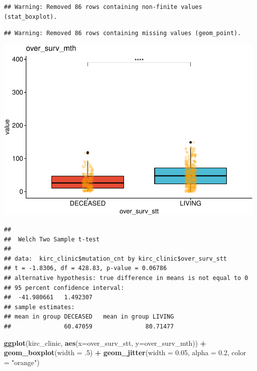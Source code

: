 \documentclass[]{article}
\newenvironment{Shaded}{\begin{snugshade}}{\end{snugshade}}
\newcommand{\KeywordTok}[1]{\textcolor[rgb]{0.13,0.29,0.53}{\textbf{#1}}}
\newcommand{\DataTypeTok}[1]{\textcolor[rgb]{0.13,0.29,0.53}{#1}}
\newcommand{\DecValTok}[1]{\textcolor[rgb]{0.00,0.00,0.81}{#1}}
\newcommand{\FloatTok}[1]{\textcolor[rgb]{0.00,0.00,0.81}{#1}}
\newcommand{\StringTok}[1]{\textcolor[rgb]{0.31,0.60,0.02}{#1}}
\newcommand{\OperatorTok}[1]{\textcolor[rgb]{0.81,0.36,0.00}{\textbf{#1}}}
\newcommand{\NormalTok}[1]{#1}
\begin{document}
\begin{verbatim}
## Warning: Removed 86 rows containing non-finite values (stat_boxplot).
\end{verbatim}

\begin{verbatim}
## Warning: Removed 86 rows containing missing values (geom_point).
\end{verbatim}

\includegraphics{figs/render-unnamed-chunk-12-6.pdf}

\begin{Shaded}
\end{Shaded}

\begin{verbatim}
## 
##  Welch Two Sample t-test
## 
## data:  kirc_clinic$mutation_cnt by kirc_clinic$over_surv_stt
## t = -1.8306, df = 428.83, p-value = 0.06786
## alternative hypothesis: true difference in means is not equal to 0
## 95 percent confidence interval:
##  -41.980661   1.492307
## sample estimates:
## mean in group DECEASED   mean in group LIVING 
##               60.47059               80.71477
\end{verbatim}

\begin{Shaded}
\begin{Highlighting}[]
\KeywordTok{ggplot}\NormalTok{(kirc_clinic, }\KeywordTok{aes}\NormalTok{(}\DataTypeTok{x=}\NormalTok{over_surv_stt, }\DataTypeTok{y=}\NormalTok{over_surv_mth)) }\OperatorTok{+}
\StringTok{  }\KeywordTok{geom_boxplot}\NormalTok{(}\DataTypeTok{width =}\NormalTok{ .}\DecValTok{5}\NormalTok{) }\OperatorTok{+}
\StringTok{  }\KeywordTok{geom_jitter}\NormalTok{(}\DataTypeTok{width =} \FloatTok{0.05}\NormalTok{, }\DataTypeTok{alpha =} \FloatTok{0.2}\NormalTok{, }\DataTypeTok{color =} \StringTok{"orange"}\NormalTok{)}
\end{Highlighting}
\end{Shaded}
\end{document}
